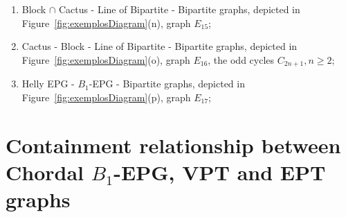 \documentclass[9pt]{entcs}
\newtheorem{defi}[thm]{Definition}%
\begin{document}
\begin{enumerate}[label=(\arabic*)]
      \item Block $\cap$  Cactus -  Line of Bipartite - Bipartite graphs, depicted in Figure~\ref{fig:exemplosDiagram}(n), graph $E_{15}$;%
      \item Cactus - Block -  Line of Bipartite - Bipartite graphs, depicted in Figure~\ref{fig:exemplosDiagram}(o), graph $E_{16}$, the odd cycles $C_{2n+1},n\geq 2$;%
      \item Helly EPG - $B_1$-EPG  - Bipartite graphs, depicted in Figure~\ref{fig:exemplosDiagram}(p), graph  $E_{17}$;%
\end{enumerate}





    




\section{Containment relationship between Chordal $B_1$-EPG, VPT and EPT graphs }
\end{document}
